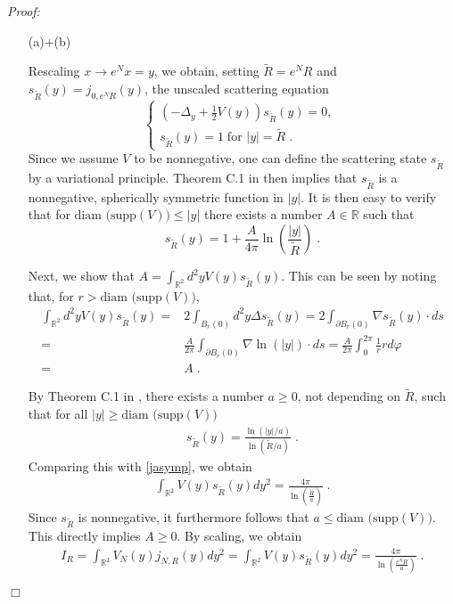 \documentclass[11pt, english, american]{article}
\newenvironment{proof}{\emph{Proof:}}{\begin{flushright} $ \Box $ \end{flushright}}
\begin{document}
\begin{proof}
\begin{enumerate}
\item[(a)+(b)] 

Rescaling $x \rightarrow e^{N} x =y$, we obtain, setting $\tilde{R}=e^{N} R$ and $s_{\tilde{R}}(y)= j_{0, e^{N}R}(y)$, the unscaled scattering equation
\begin{equation}
\begin{cases} 
\left( - \Delta_y + \frac{1}{2}V(y)  \right) s_{\tilde{R}}(y)=0 ,
\\
s_{\tilde{R}}(y)=1 \; \text{for } |y| =\tilde{R} \;.
  \end{cases} \;
\end{equation}
Since we assume $V$ to be nonnegative, one can define the scattering state $s_{\tilde{R}}$ by a variational principle. Theorem C.1 in \cite{lssy} then implies that $s_{\tilde{R}}$ is a nonnegative, spherically symmetric function in $|y|$. 
It is then easy to verify that for $\text{diam (supp} (V))  \leq |y| $ there exists a number $A\in \mathbb{R}$ such that 
\begin{equation} 
\label{jasymp}
s_{\tilde{R}}(y) =  1 + \frac{A}{4 \pi} \ln \left( \frac{|y|}{\tilde{R}} \right)
\;.
\end{equation}

Next, we show that $A= \int_{\mathbb{R}^2}d^2y V(y) s_{\tilde{R}} (y)$. This can be seen by noting that, for $r > \text{diam (supp} (V))   $,
\begin{align*}
 \int_{\mathbb{R}^2}d^2y V(y) s_{\tilde{R}}(y)
 =&
 2 \int_{B_r(0)}d^2y \Delta s_{\tilde{R}}(y)
  =
  2  \int_{\partial B_r(0)} \nabla s_{\tilde{R}}(y) \cdot ds
\nonumber \\   
    =&
   \frac{A}{2 \pi}   \int_{\partial B_r(0)} \nabla  \ln (|y|)\cdot ds
   =
   \frac{A}{2 \pi}   \int_{0}^{2 \pi} \frac{1}{r} r d\varphi
   \\
   =&
A\;.
\end{align*}

By Theorem C.1 in \cite{lssy}, there exists a number $a \geq 0$, not depending on $\tilde{R}$, such that for all $|y| \geq  \text{diam (supp} (V))$
\begin{align*}
s_{\tilde{R}}(y)= \frac{\ln(|y|/a) }{\ln(\tilde{R}/a)}
\;.
\end{align*}
Comparing this with \eqref{jasymp}, we obtain
\begin{align*}
 \int_{\mathbb{R}^2} V(y) s_{\tilde{R}}(y) dy^2=
  \frac{ 4 \pi}{\ln \left(\frac{\tilde{R}}{a}\right)}
 \;.
\end{align*}
Since $s_{\tilde{R}}$ is nonnegative, it furthermore follows that $a \leq  \text{diam (supp} (V))$.
This directly implies $A \geq 0$. By scaling, we obtain
\begin{align*}
I_R= \int_{\mathbb{R}^2} V_N(y) j_{N,R}(y) dy^2
=
 \int_{\mathbb{R}^2} V(y) s_{\tilde{R}}(y) dy^2
 =
 \frac{ 4 \pi}{ \ln \left(\frac{e^N R}{a}\right)}
 \;.
\end{align*}




\end{enumerate}
\end{proof}
\end{document}
